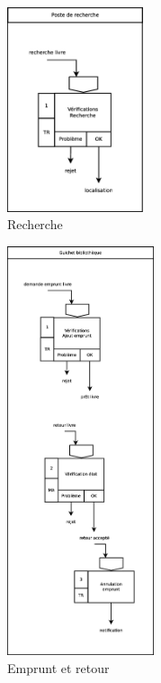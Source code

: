 \begin{figure}[!htb]
    \begin{center}
    \includegraphics[height=6cm]{images/cc1_mot2.eps}
    \caption{\label{cc1_mot2} Recherche}
    \end{center}
\end{figure}

\begin{figure}[!htb]
    \begin{center}
    \includegraphics[height=12cm]{images/cc1_mot3.eps}
    \caption{\label{cc1_mot3} Emprunt et retour}
    \end{center}
\end{figure}

